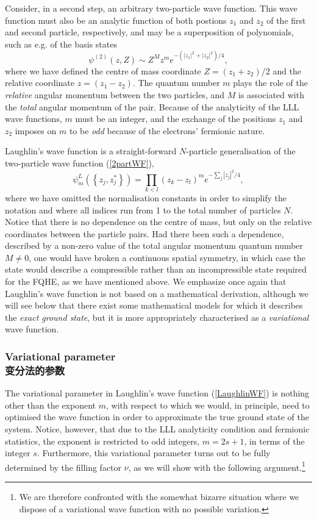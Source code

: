 \documentclass[10pt]{book}
\newcommand{\beq}{\begin{equation}}
\newcommand{\eeq}{\end{equation}}
\begin{document}
Consider, in a second step, an arbitrary two-particle wave function. 
This wave function must also be an analytic function of both postions $z_1$ and
$z_2$ of the first and second particle, respectively, and may be a superposition of polynomials, such as e.g. of the basis states
\beq\label{2partWF}
\psi^{(2)}(z,Z)\sim Z^M z^m e^{-(|z_1|^2+|z_2|^2)/4},
\eeq
where we have defined the centre of mass coordinate $Z=(z_1+z_2)/2$ and the relative coordinate $z=(z_1-z_2)$.
The quantum number $m$ plays the role of the {\sl relative} angular momentum between the two particles, and $M$ is
associated with the {\sl total} angular momentum of the pair. Because of the analyticity of the LLL wave functions, $m$ must be an 
integer, and the exchange of the positions $z_1$ and $z_2$ imposes on $m$ to be {\sl odd} because of the electrons' 
fermionic nature. 

Laughlin's wave function \cite{laughlin} is a straight-forward 
$N$-particle generalisation of the two-particle wave function (\ref{2partWF}),
\beq\label{LaughlinWF}
\psi_m^L\left(\left\{z_j,z_j^*\right\}\right) = \prod_{k<l}\left(z_k - z_l\right)^m e^{-\sum_j|z_j|^2/4},
\eeq
where we have omitted the normalisation constants in order to simplify the notation
and where all indices run from 1 to 
the total number of particles $N$. Notice that there is no 
dependence on the centre of mass, but only on the relative coordinates between the particle pairs. Had there been 
such a dependence, described by a non-zero value of the total angular momentum quantum number $M\neq 0$, one would have
broken a continuous spatial symmetry, in which case the state would  describe a compressible rather than an 
incompressible state required for the FQHE, as we have mentioned above. We emphasize once again that Laughlin's wave function
is not based on a mathematical derivation, although we will see below that there exist some mathematical models for which
it describes the {\sl exact ground state}, but it is more appropriately characterised as a {\sl variational} wave function.



\subsubsection[变分法的参数]{Variational parameter\\\bf 变分法的参数}

The variational parameter in Laughlin's wave function (\ref{LaughlinWF})
is nothing other than the exponent $m$, with respect to which we would, in principle, need to optimised 
the wave function in order to
approximate the true ground state of the system. Notice, however, that due to the LLL analyticity condition and fermionic 
statistics, the exponent is restricted to odd integers, $m=2s+1$, in terms of the integer $s$.
Furthermore, this variational parameter turns
out to be fully determined by the filling factor $\nu$, as we will show with the following argument.\footnote{We are therefore
confronted with the somewhat bizarre situation where we dispose of a variational wave function with no possible variation.}
\end{document}
